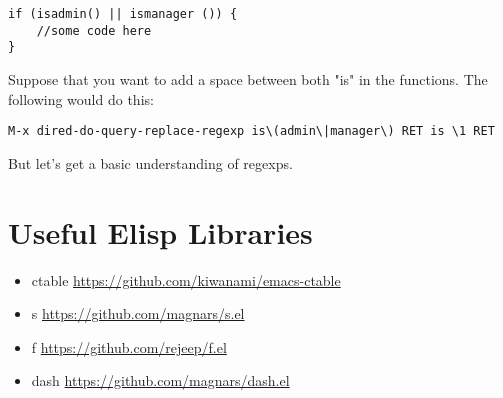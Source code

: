\documentclass[11pt]{article}
\begin{document}
\begin{verbatim}
if (isadmin() || ismanager ()) {
    //some code here
}
\end{verbatim}

Suppose that you want to add a space between both "is" in the functions.  The following would do this:

\texttt{M-x dired-do-query-replace-regexp is\textbackslash{}(admin\textbackslash{}|manager\textbackslash{}) RET is \textbackslash{}1 RET}

But let's get a basic understanding of regexps.

\section{Useful Elisp Libraries}
\label{sec:orgheadline32}
\begin{itemize}
\item ctable \url{https://github.com/kiwanami/emacs-ctable}
\item s \url{https://github.com/magnars/s.el}
\item f \url{https://github.com/rejeep/f.el}
\item dash \url{https://github.com/magnars/dash.el}
\end{itemize}
\end{document}
